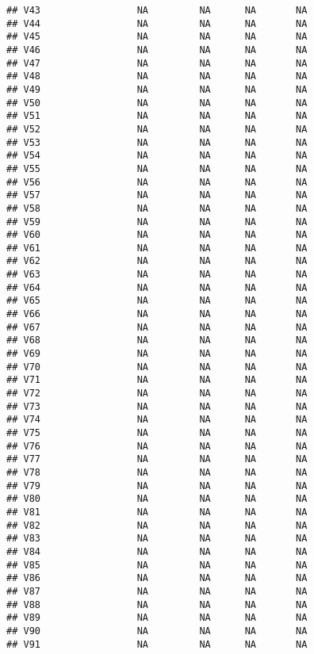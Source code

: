 \documentclass[
]{article}
\begin{document}
\begin{verbatim}
## V43                 NA         NA      NA       NA
## V44                 NA         NA      NA       NA
## V45                 NA         NA      NA       NA
## V46                 NA         NA      NA       NA
## V47                 NA         NA      NA       NA
## V48                 NA         NA      NA       NA
## V49                 NA         NA      NA       NA
## V50                 NA         NA      NA       NA
## V51                 NA         NA      NA       NA
## V52                 NA         NA      NA       NA
## V53                 NA         NA      NA       NA
## V54                 NA         NA      NA       NA
## V55                 NA         NA      NA       NA
## V56                 NA         NA      NA       NA
## V57                 NA         NA      NA       NA
## V58                 NA         NA      NA       NA
## V59                 NA         NA      NA       NA
## V60                 NA         NA      NA       NA
## V61                 NA         NA      NA       NA
## V62                 NA         NA      NA       NA
## V63                 NA         NA      NA       NA
## V64                 NA         NA      NA       NA
## V65                 NA         NA      NA       NA
## V66                 NA         NA      NA       NA
## V67                 NA         NA      NA       NA
## V68                 NA         NA      NA       NA
## V69                 NA         NA      NA       NA
## V70                 NA         NA      NA       NA
## V71                 NA         NA      NA       NA
## V72                 NA         NA      NA       NA
## V73                 NA         NA      NA       NA
## V74                 NA         NA      NA       NA
## V75                 NA         NA      NA       NA
## V76                 NA         NA      NA       NA
## V77                 NA         NA      NA       NA
## V78                 NA         NA      NA       NA
## V79                 NA         NA      NA       NA
## V80                 NA         NA      NA       NA
## V81                 NA         NA      NA       NA
## V82                 NA         NA      NA       NA
## V83                 NA         NA      NA       NA
## V84                 NA         NA      NA       NA
## V85                 NA         NA      NA       NA
## V86                 NA         NA      NA       NA
## V87                 NA         NA      NA       NA
## V88                 NA         NA      NA       NA
## V89                 NA         NA      NA       NA
## V90                 NA         NA      NA       NA
## V91                 NA         NA      NA       NA

\end{verbatim}
\end{document}
